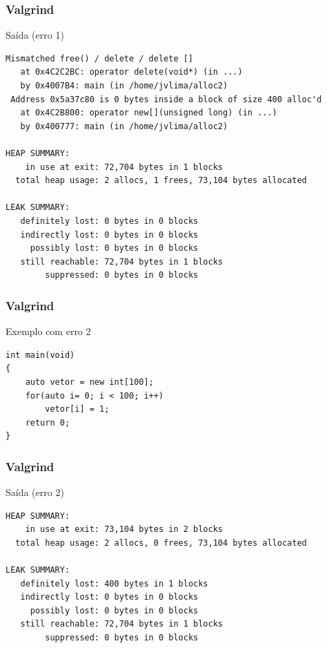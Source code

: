 \documentclass[xcolor={usenames,dvipsnames},10pt,compress,aspectratio=169]{beamer}
\begin{document}
\begin{frame}[fragile]
  \frametitle{Valgrind}
  \vspace{-5mm}
  \begin{block}{Saída (erro 1)}
\begin{lstlisting}
Mismatched free() / delete / delete []
   at 0x4C2C2BC: operator delete(void*) (in ...)
   by 0x4007B4: main (in /home/jvlima/alloc2)
 Address 0x5a37c80 is 0 bytes inside a block of size 400 alloc'd
   at 0x4C2B800: operator new[](unsigned long) (in ...)
   by 0x400777: main (in /home/jvlima/alloc2)

HEAP SUMMARY:
    in use at exit: 72,704 bytes in 1 blocks
  total heap usage: 2 allocs, 1 frees, 73,104 bytes allocated

LEAK SUMMARY:
   definitely lost: 0 bytes in 0 blocks
   indirectly lost: 0 bytes in 0 blocks
     possibly lost: 0 bytes in 0 blocks
   still reachable: 72,704 bytes in 1 blocks
        suppressed: 0 bytes in 0 blocks
\end{lstlisting}
\end{block}
\end{frame}
\begin{frame}[fragile]
  \frametitle{Valgrind}
  \begin{block}{Exemplo com erro 2}
\begin{lstlisting}
int main(void)
{
    auto vetor = new int[100];
    for(auto i= 0; i < 100; i++)
        vetor[i] = 1;
    return 0;
}
\end{lstlisting}
\end{block}
\end{frame}
\begin{frame}[fragile]
  \frametitle{Valgrind}
  \begin{block}{Saída (erro 2)}
\begin{lstlisting}
HEAP SUMMARY:
    in use at exit: 73,104 bytes in 2 blocks
  total heap usage: 2 allocs, 0 frees, 73,104 bytes allocated

LEAK SUMMARY:
   definitely lost: 400 bytes in 1 blocks
   indirectly lost: 0 bytes in 0 blocks
     possibly lost: 0 bytes in 0 blocks
   still reachable: 72,704 bytes in 1 blocks
        suppressed: 0 bytes in 0 blocks
\end{lstlisting}
\end{block}
\end{frame}
\end{document}
